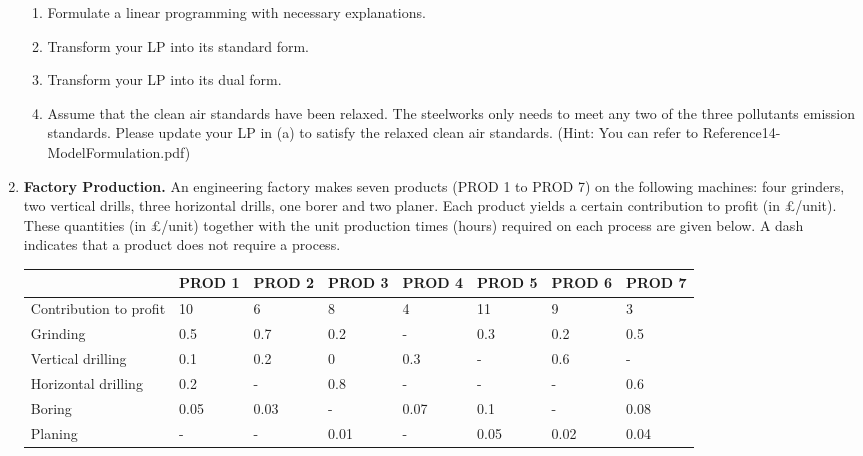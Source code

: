 \documentclass[12pt,a4paper]{article}
\theoremstyle{definition}
\begin{document}
\begin{enumerate}
\begin{table}[h]
    \end{table}
     
    
    \begin{enumerate}
    	\item Formulate a linear programming with necessary explanations.
    	\item
    	Transform your LP into its standard form.
    	\item
    	Transform your LP into its dual form.
    	\item 
    	Assume that the clean air standards have been relaxed. The steelworks only needs to meet any two of the three pollutants emission standards. Please update your LP in (a) to satisfy the relaxed clean air standards. {\color{blue}(Hint: You can refer to Reference14-ModelFormulation.pdf)}
    	
    \end{enumerate}
     
    
    
	\item 
	\textbf{Factory Production. }An engineering factory makes seven products (PROD 1 to PROD 7) on the following machines: four grinders, two vertical drills, three horizontal drills, one borer and two planer. Each product yields a certain contribution to profit (in \pounds/unit). These quantities (in \pounds/unit) together with the unit production times (hours) required on each process are given below. A dash indicates that a product does not require a process.
	
	\begin{table}[htbp]
		\scriptsize
		\centering
		\renewcommand\arraystretch{1.1}
		\begin{tabular}{m{} m{}<{\centering} m{}<{\centering} m{}<{\centering} m{}<{\centering} m{}<{\centering} m{}<{\centering} m{}<{\centering}}
			\hline
			& \textbf{PROD 1} & \textbf{PROD 2} & \textbf{PROD 3} & \textbf{PROD 4} & \textbf{PROD 5} & \textbf{PROD 6} &  \textbf{PROD 7} \\\hline
			Contribution to profit & 10 & 6 & 8 & 4 & 11 & 9 & 3 \\
			Grinding & 0.5 & 0.7 & 0.2 & - & 0.3 & 0.2 & 0.5 \\
			Vertical drilling & 0.1 & 0.2 & 0 & 0.3 & - & 0.6 & - \\
			Horizontal drilling & 0.2 & - & 0.8 & - & - & - & 0.6 \\
			Boring & 0.05 & 0.03 & - & 0.07 & 0.1 & - & 0.08 \\
			Planing & - & - & 0.01 & - & 0.05 & 0.02 & 0.04 \\
			\hline
		\end{tabular}
	\end{table}
	

\end{enumerate}
\end{document}
